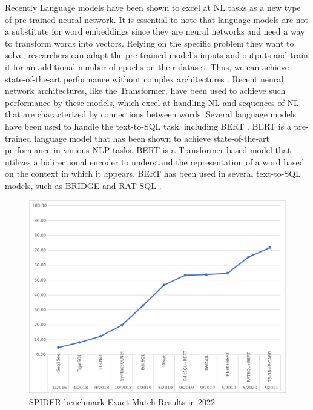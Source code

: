 Recently Language models have been shown to excel at NL tasks as a new type of pre-trained neural network. It is essential to note that language models are not a substitute for word embeddings since they are neural networks and need a way to transform words into vectors.
Relying on the specific problem they want to solve, researchers can adapt the pre-trained model's inputs and outputs and train it for an additional number of epochs on their dataset. Thus, we can achieve state-of-the-art performance without complex architectures \cite{DBLP:journals/corr/abs-1810-04805}. Recent neural network architectures, like the Transformer\cite{https://doi.org/10.48550/arxiv.1706.03762}, have been used to achieve such performance by these models, which excel at handling NL and sequences of NL that are characterized by connections between words. Several language models have been used to handle the text-to-SQL task, including BERT \cite{DBLP:journals/corr/abs-1810-04805}. BERT is a pre-trained language model that has been shown to achieve state-of-the-art performance in various NLP tasks. BERT is a Transformer-based model that utilizes a bidirectional encoder to understand the representation of a word based on the context in which it appears. BERT has been used in several text-to-SQL models, such as BRIDGE \cite{lin_bridging_2020} and RAT-SQL \cite{wang_rat_sql_2021}.


\begin{figure}[h]
  \centering
  \includegraphics[width=0.99\linewidth]{pics/benchmarkeps}
  \caption{SPIDER benchmark Exact Match Results in 2022}
  \label{fig:benchmark}
\end{figure}


\clearpage

\clearpage

\clearpage



% 
% 
% 
% 
% 
% 
% 
% 
